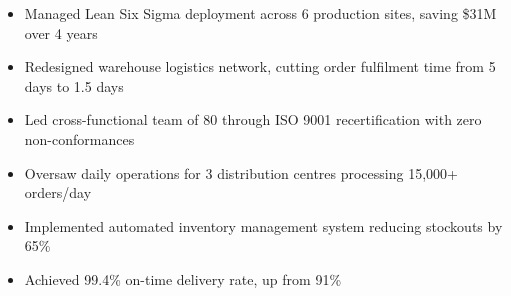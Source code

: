\begin{itemize}

  \item Managed Lean Six Sigma deployment across 6 production sites, saving \$31M over 4 years

  \item Redesigned warehouse logistics network, cutting order fulfilment time from 5 days to 1.5 days

  \item Led cross-functional team of 80 through ISO 9001 recertification with zero non-conformances

\end{itemize}





\begin{itemize}

  \item Oversaw daily operations for 3 distribution centres processing 15,000+ orders/day

  \item Implemented automated inventory management system reducing stockouts by 65\%

  \item Achieved 99.4\% on-time delivery rate, up from 91\%

\end{itemize}



